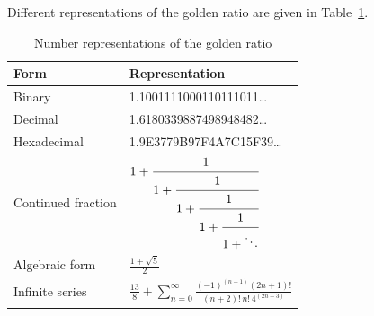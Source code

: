 Different representations of the golden ratio are given in Table~\ref{tab:goldenratio}.

\begin{table}[p!]\centering
\caption{Number representations of the golden ratio}
\label{tab:goldenratio}

\begin{tabular}{|l|l|}
\hline
Form & Representation\\\hline
Binary & 1.1001111000110111011\ldots\\\hline
Decimal & 1.6180339887498948482\ldots\\\hline
Hexadecimal	& 1.9E3779B97F4A7C15F39\ldots\\\hline
Continued fraction & $1 + \cfrac{1}{1 + \cfrac{1}{1 + \cfrac{1}{1 + \cfrac{1}{1 + \ddots}}}}$\\[6ex]\hline
Algebraic form & $\displaystyle\frac{1 + \sqrt{5}}{2}$\\[2ex]\hline
Infinite series & $\displaystyle\frac{13}{8}+\sum_{n=0}^{\infty}\frac{(-1)^{(n+1)}(2n+1)!}{(n+2)!\,n!\,4^{(2n+3)}}$\\[2ex]\hline
\end{tabular}
\end{table}
